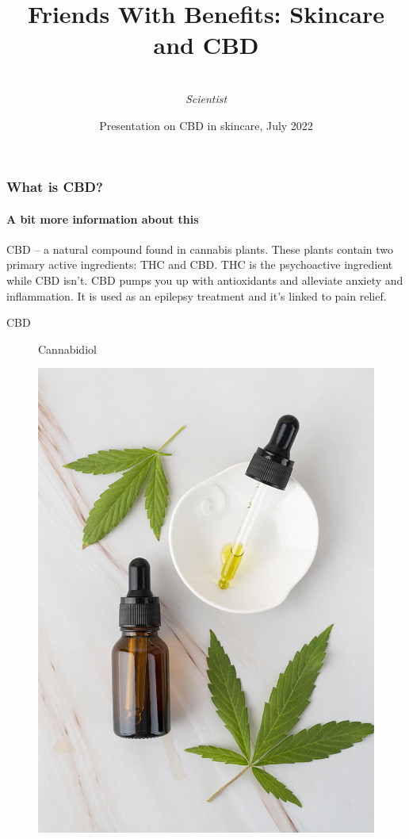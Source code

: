 \documentclass{beamer}
\title[CBD super]{Friends With Benefits:   Skincare and CBD}
\author%
{%
    \sc{E.Kurlovich}\\
    \textit{Scientist}
}
\institute%
{%
    \textit{Beauty institute}\\
    \textit{University of Oxford}
}
\date[2022]{Presentation on CBD in skincare, July 2022} %
\begin{document}
    \begin{frame}[plain]
        \titlepage
    \end{frame}
    
    \begin{frame}
       
        \frametitle{What is CBD?}
        \framesubtitle{A bit more information about this}
        
        CBD  – a natural compound found in cannabis plants. These plants contain two primary active ingredients: THC and CBD. THC is the psychoactive ingredient while CBD isn’t. CBD pumps you up with antioxidants and alleviate anxiety and inflammation. It is used as an epilepsy treatment and it’s linked to pain relief.
        \begin{description}
\item[CBD] Cannabidiol
        \end{description}
       \begin{figure}[H]
  \centering
    \includegraphics[scale=0.1]{images/hemp.jpg}

\end{figure}
\end{frame}
\end{document}

